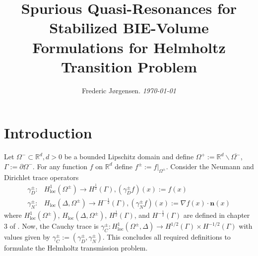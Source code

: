 \documentclass[10pt,journal,compsoc, onecolumn]{IEEEtran}
\begin{document}
\title{Spurious Quasi-Resonances for Stabilized BIE-Volume Formulations for Helmholtz Transition Problem}

\author{Frederic Jørgensen. \textit{\today}}







\maketitle

\IEEEdisplaynontitleabstractindextext
\IEEEpeerreviewmaketitle



\section{Introduction}
Let \(\Omega^- \subset \mathbb{R}^d, d > 0\) be a bounded Lipschitz domain and 
define \(\Omega^{+}:=\mathbb{R}^{d} \backslash \overline{\Omega^{-}}\), 
\(\Gamma := \partial \Omega^-\).
For any function $f$ on $\mathbb{R}^d$ define $f^\pm :=f|_{\Omega^{\pm}}$. 
Consider the Neumann and Dirichlet trace operators 
\begin{align}
    \gamma_{D}^{\pm}: & H_{\mathrm{loc}}^{1}\left(\Omega^{\pm}\right) \rightarrow H^{\frac{1}{2}}(\Gamma), \left(\gamma_{D}^{\pm} f\right)({x}):=f({x}) \nonumber \\
    \gamma_{N}^{\pm}: & H_{\mathrm{loc}}\left(\Delta, \Omega^{\pm}\right) \rightarrow H^{-\frac{1}{2}}(\Gamma), \left(\gamma_{N}^{\pm} f\right)({x}):=\nabla f({x}) \cdot \mathbf{n}({x}) \nonumber
\end{align}
where \(H_{\mathrm{loc}}^{1}\left(\Omega^{\pm}\right)\),
\(H_{\mathrm{loc}}\left(\Delta, \Omega^{\pm}\right)\), 
\(H^{\frac{1}{2}}(\Gamma)\), and \(H^{-\frac{1}{2}}(\Gamma)\)
are defined in chapter 3 of  \cite{mclean2000strongly}.
Now, the Cauchy trace is \(\gamma_{C}^{\pm}: H_{\mathrm{loc}}^{1}\left(\Omega^{\pm}, \Delta\right) \rightarrow H^{1 / 2}(\Gamma) \times H^{-1 / 2}(\Gamma)\) with values given 
by \(\gamma_{C}^{\pm}:=\left(\gamma_{D}^{\pm}, \gamma_{N}^{\pm}\right)\). 
This concludes all required definitions to formulate the Helmholtz transmission problem.
\end{document}
